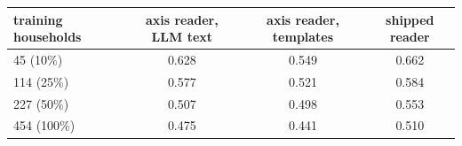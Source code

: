 \begin{tabular}{lccc}
\toprule
training households & axis reader, LLM text & axis reader, templates & shipped reader \\
\midrule
45 (10\%) & 0.628 & 0.549 & 0.662 \\
114 (25\%) & 0.577 & 0.521 & 0.584 \\
227 (50\%) & 0.507 & 0.498 & 0.553 \\
454 (100\%) & 0.475 & 0.441 & 0.510 \\
\bottomrule
\end{tabular}